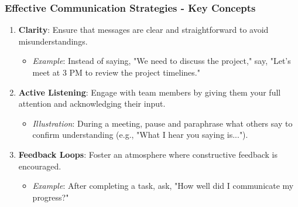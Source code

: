 \documentclass[aspectratio=169]{beamer}
\begin{document}
\begin{frame}[fragile]
    \frametitle{Effective Communication Strategies - Key Concepts}
    \begin{enumerate}
        \item \textbf{Clarity}: Ensure that messages are clear and straightforward to avoid misunderstandings.
              \begin{itemize}
                  \item \textit{Example}: Instead of saying, "We need to discuss the project," say, "Let's meet at 3 PM to review the project timelines."
              \end{itemize}
        
        \item \textbf{Active Listening}: Engage with team members by giving them your full attention and acknowledging their input.
              \begin{itemize}
                  \item \textit{Illustration}: During a meeting, pause and paraphrase what others say to confirm understanding (e.g., "What I hear you saying is...").
              \end{itemize}
        
        \item \textbf{Feedback Loops}: Foster an atmosphere where constructive feedback is encouraged. 
              \begin{itemize}
                  \item \textit{Example}: After completing a task, ask, "How well did I communicate my progress?" 
              \end{itemize}
    \end{enumerate}
\end{frame}
\end{document}
